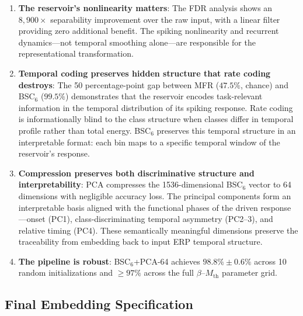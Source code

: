 \begin{enumerate}
    \item \textbf{The reservoir's nonlinearity matters}: The FDR analysis shows an $8{,}900\times$ separability improvement over the raw input, with a linear filter providing zero additional benefit. The spiking nonlinearity and recurrent dynamics---not temporal smoothing alone---are responsible for the representational transformation.

    \item \textbf{Temporal coding preserves hidden structure that rate coding destroys}: The 50 percentage-point gap between MFR ($47.5\%$, chance) and BSC$_6$ ($99.5\%$) demonstrates that the reservoir encodes task-relevant information in the temporal distribution of its spiking response. Rate coding is informationally blind to the class structure when classes differ in temporal profile rather than total energy. BSC$_6$ preserves this temporal structure in an interpretable format: each bin maps to a specific temporal window of the reservoir's response.

    \item \textbf{Compression preserves both discriminative structure and interpretability}: PCA compresses the 1536-dimensional BSC$_6$ vector to 64 dimensions with negligible accuracy loss. The principal components form an interpretable basis aligned with the functional phases of the driven response---onset (PC1), class-discriminating temporal asymmetry (PC2--3), and relative timing (PC4). These semantically meaningful dimensions preserve the traceability from embedding back to input ERP temporal structure.

    \item \textbf{The pipeline is robust}: BSC$_6$+PCA-64 achieves $98.8\% \pm 0.6\%$ across 10 random initializations and $\geq 97\%$ across the full $\beta$--$M_{\text{th}}$ parameter grid.
\end{enumerate}

\subsection{Final Embedding Specification}

